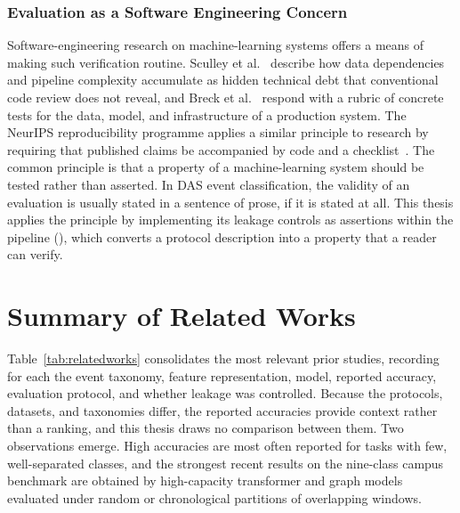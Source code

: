 \subsubsection{Evaluation as a Software Engineering Concern}
\label{sec:chap2LeakSoftware}
Software-engineering research on machine-learning systems offers a means of making such verification routine. Sculley et al.~\cite{sculley2015debt} describe how data dependencies and pipeline complexity accumulate as hidden technical debt that conventional code review does not reveal, and Breck et al.~\cite{breck2017mltest} respond with a rubric of concrete tests for the data, model, and infrastructure of a production system. The NeurIPS reproducibility programme applies a similar principle to research by requiring that published claims be accompanied by code and a checklist~\cite{pineau2021reproducibility}. The common principle is that a property of a machine-learning system should be tested rather than asserted. In DAS event classification, the validity of an evaluation is usually stated in a sentence of prose, if it is stated at all. This thesis applies the principle by implementing its leakage controls as assertions within the pipeline (), which converts a protocol description into a property that a reader can verify.

\section{Summary of Related Works}
\label{sec:chap2RelatedWorks}
Table~\ref{tab:relatedworks} consolidates the most relevant prior studies, recording for each the event taxonomy, feature representation, model, reported accuracy, evaluation protocol, and whether leakage was controlled. Because the protocols, datasets, and taxonomies differ, the reported accuracies provide context rather than a ranking, and this thesis draws no comparison between them. Two observations emerge. High accuracies are most often reported for tasks with few, well-separated classes, and the strongest recent results on the nine-class campus benchmark are obtained by high-capacity transformer and graph models evaluated under random or chronological partitions of overlapping windows.

